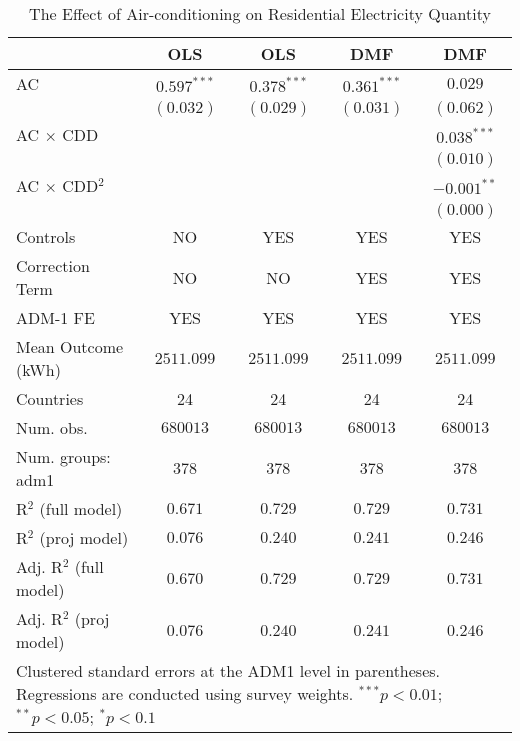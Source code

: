 
\begin{table}[htbp]
\caption{The Effect of Air-conditioning on Residential Electricity Quantity}
\begin{center}
\begin{tabular}{l c c c c}
\hline
 & OLS & OLS & DMF & DMF \\
\hline
AC                      & $0.597^{***}$ & $0.378^{***}$ & $0.361^{***}$ & $0.029$       \\
                        & $(0.032)$     & $(0.029)$     & $(0.031)$     & $(0.062)$     \\
AC $\times$ CDD         &               &               &               & $0.038^{***}$ \\
                        &               &               &               & $(0.010)$     \\
AC $\times$ CDD$^2$     &               &               &               & $-0.001^{**}$ \\
                        &               &               &               & $(0.000)$     \\
\hline
Controls                & NO            & YES           & YES           & YES           \\
Correction Term         & NO            & NO            & YES           & YES           \\
ADM-1 FE                & YES           & YES           & YES           & YES           \\
Mean Outcome (kWh)      & $2511.099$    & $2511.099$    & $2511.099$    & $2511.099$    \\
Countries               & 24            & 24            & 24            & 24            \\
Num. obs.               & $680013$      & $680013$      & $680013$      & $680013$      \\
Num. groups: adm1       & $378$         & $378$         & $378$         & $378$         \\
R$^2$ (full model)      & $0.671$       & $0.729$       & $0.729$       & $0.731$       \\
R$^2$ (proj model)      & $0.076$       & $0.240$       & $0.241$       & $0.246$       \\
Adj. R$^2$ (full model) & $0.670$       & $0.729$       & $0.729$       & $0.731$       \\
Adj. R$^2$ (proj model) & $0.076$       & $0.240$       & $0.241$       & $0.246$       \\
\hline
\multicolumn{5}{l}{\scriptsize{Clustered standard errors at the ADM1 level in parentheses. Regressions are conducted using survey weights. $^{***}p<0.01$; $^{**}p<0.05$; $^{*}p<0.1$}}
\end{tabular}
\label{si: baseline_nok}
\end{center}
\end{table}
